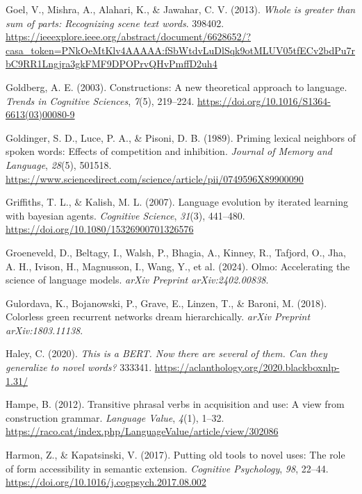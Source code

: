 \documentclass[
  12pt,
  letterpaper,
]{scrreport}
\newlength{\cslhangindent}
\newenvironment{CSLReferences}[2] %
 {\begin{list}{}{%
  \setlength{\itemindent}{0pt}
  \setlength{\leftmargin}{0pt}
  \setlength{\parsep}{0pt}
  \ifodd #1
   \setlength{\leftmargin}{\cslhangindent}
   \setlength{\itemindent}{-1\cslhangindent}
  \fi
  \setlength{\itemsep}{#2\baselineskip}}}
 {\end{list}}
\begin{document}
\begin{CSLReferences}{1}{0}
Goel, V., Mishra, A., Alahari, K., \& Jawahar, C. V. (2013). \emph{Whole
is greater than sum of parts: Recognizing scene text words}. 398402.
\url{https://ieeexplore.ieee.org/abstract/document/6628652/?casa_token=PNkOeMtKlv4AAAAA:fSbWtdvLuDlSqk9otMLUV05tfECv2bdPu7rbC9RR1Lngjra3gkFMF9DPOPrvQHvPmffD2uh4}

Goldberg, A. E. (2003). Constructions: A new theoretical approach to
language. \emph{Trends in Cognitive Sciences}, \emph{7}(5), 219--224.
\url{https://doi.org/10.1016/S1364-6613(03)00080-9}

Goldinger, S. D., Luce, P. A., \& Pisoni, D. B. (1989). Priming lexical
neighbors of spoken words: Effects of competition and inhibition.
\emph{Journal of Memory and Language}, \emph{28}(5), 501518.
\url{https://www.sciencedirect.com/science/article/pii/0749596X89900090}

Griffiths, T. L., \& Kalish, M. L. (2007). Language evolution by
iterated learning with bayesian agents. \emph{Cognitive Science},
\emph{31}(3), 441--480. \url{https://doi.org/10.1080/15326900701326576}

Groeneveld, D., Beltagy, I., Walsh, P., Bhagia, A., Kinney, R., Tafjord,
O., Jha, A. H., Ivison, H., Magnusson, I., Wang, Y., et al. (2024).
Olmo: Accelerating the science of language models. \emph{arXiv Preprint
arXiv:2402.00838}.

Gulordava, K., Bojanowski, P., Grave, E., Linzen, T., \& Baroni, M.
(2018). Colorless green recurrent networks dream hierarchically.
\emph{arXiv Preprint arXiv:1803.11138}.

Haley, C. (2020). \emph{This is a BERT. Now there are several of them.
Can they generalize to novel words?} 333341.
\url{https://aclanthology.org/2020.blackboxnlp-1.31/}

Hampe, B. (2012). Transitive phrasal verbs in acquisition and use: A
view from construction grammar. \emph{Language Value}, \emph{4}(1),
1--32.
\url{https://raco.cat/index.php/LanguageValue/article/view/302086}

Harmon, Z., \& Kapatsinski, V. (2017). Putting old tools to novel uses:
The role of form accessibility in semantic extension. \emph{Cognitive
Psychology}, \emph{98}, 22--44.
\url{https://doi.org/10.1016/j.cogpsych.2017.08.002}


\end{CSLReferences}
\end{document}
